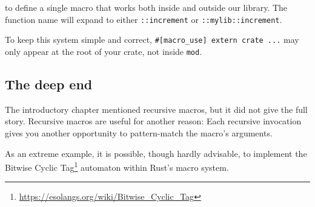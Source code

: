 \documentclass[a4paper,]{book}
\newenvironment{Shaded}{\begin{snugshade}}{\end{snugshade}}
\newcommand{\DecValTok}[1]{\textcolor[rgb]{0.00,0.00,0.81}{{#1}}}
\newcommand{\CommentTok}[1]{\textcolor[rgb]{0.56,0.35,0.01}{\textit{{#1}}}}
\newcommand{\PreprocessorTok}[1]{\textcolor[rgb]{0.56,0.35,0.01}{\textit{{#1}}}}
\newcommand{\NormalTok}[1]{{#1}}
\renewcommand{\href}[2]{#2\footnote{\url{#1}}}
\begin{document}
to define a single macro that works both inside and outside our library.
The function name will expand to either \texttt{::increment} or
\texttt{::mylib::increment}.

To keep this system simple and correct,
\texttt{\#{[}macro\_use{]}\ extern\ crate\ ...} may only appear at the
root of your crate, not inside \texttt{mod}.

\subsection{The deep end}\label{the-deep-end}

The introductory chapter mentioned recursive macros, but it did not give
the full story. Recursive macros are useful for another reason: Each
recursive invocation gives you another opportunity to pattern-match the
macro's arguments.

As an extreme example, it is possible, though hardly advisable, to
implement the
\href{https://esolangs.org/wiki/Bitwise_Cyclic_Tag}{Bitwise Cyclic Tag}
automaton within Rust's macro system.

\begin{Shaded}
\end{Shaded}
\end{document}
